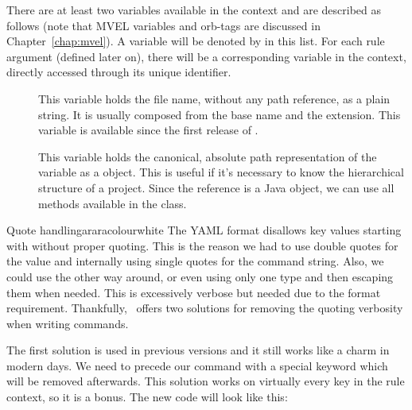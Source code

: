 \begin{description}
\begin{description}


There are at least two variables available in the  context and are described as follows (note that \gls{MVEL} variables and \glspl{orb-tag} are discussed in Chapter~\ref{chap:mvel}). A variable will be denoted by  in this list. For each rule argument (defined later on), there will be a corresponding variable in the  context, directly accessed through its unique identifier.

\begin{description}
\item[] This variable holds the file name, without any path reference, as a plain string. It is usually composed from the base name and the extension. This variable is available since the first release of \arara.

\item[] This variable holds the canonical, absolute path representation of the  variable as a  object. This is useful if it's necessary to know the hierarchical structure of a project. Since the reference is a Java object, we can use all methods available in the  class.
\end{description}

\begin{messagebox}{Quote handling}{araracolour}{\icinfo}{white}
\setlength{\parskip}{1em}
The \gls{YAML} format disallows key values starting with  without proper quoting. This is the reason we had to use double quotes for the value and internally using single quotes for the command string. Also, we could use the other way around, or even using only one type and then escaping them when needed. This is excessively verbose but needed due to the format requirement. Thankfully, \arara\ offers two solutions for removing the quoting verbosity when writing commands.

The first solution is used in previous versions and it still works like a charm in modern days. We need to precede our command with a special keyword  which will be removed afterwards. This solution works on virtually every key in the rule context, so it is a bonus. The new code will look like this:


\end{messagebox}
\end{description}
\end{description}
